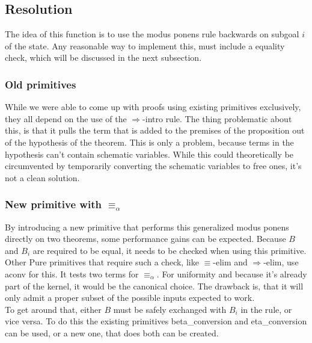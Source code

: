 \subsection{Resolution}

The idea of this function is to use the modus ponens rule backwards on subgoal $i$ of the state. Any reasonable way to implement this, must include a equality check, which will be discussed in the next subsection.

\subsubsection{Old primitives}

While we were able to come up with proofs using existing primitives exclusively, they all depend on the use of the $\Longrightarrow$-intro rule. The thing problematic about this, is that it pulls the term that is added to the premises of the proposition out of the hypothesis of the theorem. This is only a problem, because terms in the hypothesis can't contain schematic variables. While this could theoretically be circumvented by temporarily converting the schematic variables to free ones, it's not a clean solution.

\subsubsection{New primitive with $\equiv_\alpha$}

By introducing a new primitive that performs this generalized modus ponens directly on two theorems, some performance gains can be expected. Because $B$ and $B_i$ are required to be equal, it needs to be checked when using this primitive. Other Pure primitives that require such a check, like $\equiv$-elim and $\Longrightarrow$-elim, use aconv for this. It tests two terms for $\equiv_\alpha$. For uniformity and because it's already part of the kernel, it would be the canonical choice. The drawback is, that it will only admit a proper subset of the possible inputs expected to work.\\
To get around that, either $B$ must be safely exchanged with $B_i$ in the rule, or vice versa. To do this the existing primitives beta\_conversion and eta\_conversion can be used, or a new one, that does both can be created.

